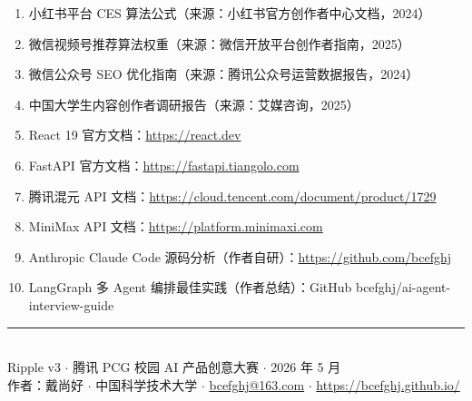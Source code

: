 \documentclass[12pt,a4paper]{ctexart}
\begin{document}
\begin{enumerate}
  \item 小红书平台 CES 算法公式（来源：小红书官方创作者中心文档，2024）
  \item 微信视频号推荐算法权重（来源：微信开放平台创作者指南，2025）
  \item 微信公众号 SEO 优化指南（来源：腾讯公众号运营数据报告，2024）
  \item 中国大学生内容创作者调研报告（来源：艾媒咨询，2025）
  \item React 19 官方文档：\url{https://react.dev}
  \item FastAPI 官方文档：\url{https://fastapi.tiangolo.com}
  \item 腾讯混元 API 文档：\url{https://cloud.tencent.com/document/product/1729}
  \item MiniMax API 文档：\url{https://platform.minimaxi.com}
  \item Anthropic Claude Code 源码分析（作者自研）：\url{https://github.com/bcefghj}
  \item LangGraph 多 Agent 编排最佳实践（作者总结）：GitHub bcefghj/ai-agent-interview-guide
\end{enumerate}

\vspace{1cm}
\begin{center}
\textcolor{textmuted}{\rule{10cm}{0.4pt}}\\[0.3cm]
{\small\color{textmuted}
Ripple v3 $\cdot$ 腾讯 PCG 校园 AI 产品创意大赛 $\cdot$ 2026 年 5 月 \\
作者：戴尚好 $\cdot$ 中国科学技术大学 $\cdot$
\href{mailto:bcefghj@163.com}{bcefghj@163.com} $\cdot$
\url{https://bcefghj.github.io/}
}
\end{center}
\end{document}
